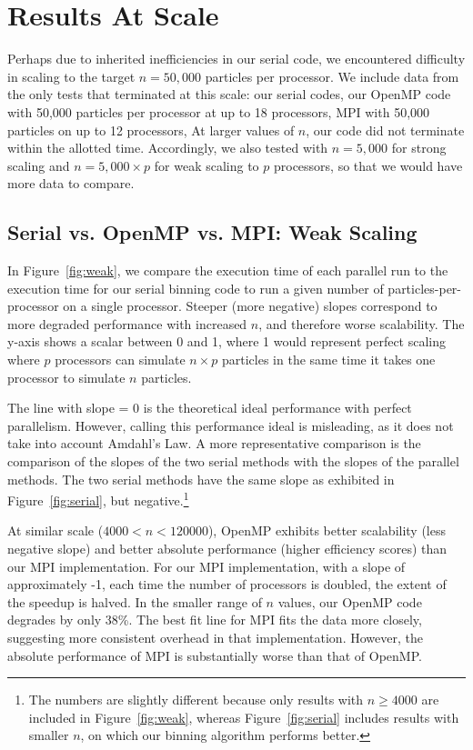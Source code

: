 \documentclass{article}
\begin{document}
\section{Results At Scale}\label{section:scale}
Perhaps due to inherited inefficiencies in our serial code, we encountered
difficulty in scaling to the target $n = 50,000$ particles per processor. We
include data from the only tests that terminated at this scale: our serial
codes, our OpenMP code with 50,000 particles per processor at up to 18
processors, MPI with 50,000 particles on up to 12 processors,
At larger values of $n$, our code did not terminate within the allotted time.
Accordingly, we also tested with $n = 5,000$ for strong scaling and $n = 5,000
\times p$ for weak scaling to $p$ processors, so that we would have more data to
compare.

\subsection{Serial vs. OpenMP vs. MPI: Weak Scaling}
In Figure~\ref{fig:weak}, we compare the execution time of each parallel run to
the execution time for our serial binning code to run a given number of
particles-per-processor on a single processor. Steeper (more negative) slopes
correspond to more degraded performance with increased $n$, and therefore worse
scalability. The y-axis shows a scalar between 0 and 1, where 1 would represent
perfect scaling where $p$ processors can simulate $n \times p$ particles in the
same time it takes one processor to simulate $n$ particles.

The line with slope = 0 is the theoretical ideal performance with perfect
parallelism. However, calling this performance ideal is misleading, as it does
not take into account Amdahl's Law. A more representative comparison is the
comparison of the slopes of the two serial methods with the slopes of the
parallel methods. The two serial methods have the same slope as exhibited in
Figure~\ref{fig:serial}, but negative.\footnote{The numbers are slightly
  different because only results with $n \ge 4000$ are included in
  Figure~\ref{fig:weak}, whereas Figure~\ref{fig:serial} includes results
with smaller $n$, on which our binning algorithm performs better.}

At similar scale ($4000 < n < 120000$), OpenMP exhibits better scalability (less
negative slope) and better absolute performance (higher efficiency scores) than
our MPI implementation. For our MPI implementation, with a slope of
approximately -1, each time the number of processors is doubled, the extent of
the speedup is halved. In the smaller range of $n$ values, our OpenMP code
degrades by only 38\%. The best fit line for MPI fits the data more
closely, suggesting more consistent overhead in that implementation. However,
the absolute performance of MPI is substantially worse than that of OpenMP.
\end{document}
